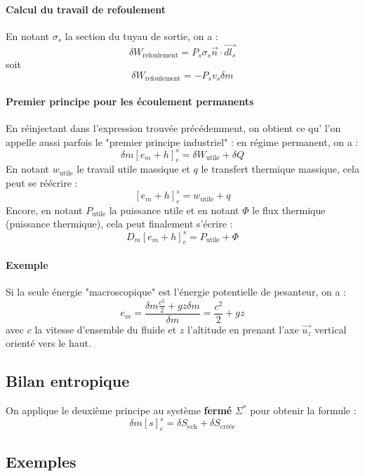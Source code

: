 \documentclass[french]{book}
\theoremstyle{plain}
\theoremstyle{definition}
\theoremstyle{remark}
\newcommand{\st}{^*}
\begin{document}
\paragraph{Calcul du travail de refoulement} En notant $\sigma_s$ la section du tuyau de sortie, on a : $$\delta W_{\text{refoulement}}=P_s\sigma_s\overrightarrow{n}\cdot\overrightarrow{dl_s}$$ soit $$\delta W_{\text{refoulement}}=-P_sv_s\delta m$$
\paragraph{Premier principe pour les écoulement permanents} En réinjectant dans l'expression trouvée précédemment, on obtient ce qu' l'on appelle aussi parfois le "premier principe industriel" : en régime permanent, on a :  $$\delta m\left[e_m+h\right]_e^s=\delta W_{\text{utile}}+\delta Q$$ En notant $w_{\text{utile}}$ le travail utile massique et $q$ le transfert thermique massique, cela peut se réécrire : $$\left[e_m+h\right]_e^s=w_{\text{utile}}+q$$ Encore, en notant $P_{\text{utile}}$ la puissance utile et en notant $\Phi$ le flux thermique (puissance thermique), cela peut finalement s'écrire : $$D_m\left[e_m+h\right]_e^s=P_{\text{utile}}+\Phi$$
\paragraph{Exemple} Si la seule énergie "macroscopique" est l'énergie potentielle de pesanteur, on a : $$e_m=\frac{\delta m\frac{c^2}{2}+gz\delta m}{\delta m}=\frac{c^2}{2}+gz$$ avec $c$ la vitesse d'ensemble du fluide et $z$ l'altitude en prenant l'axe $\overrightarrow{u_z}$ vertical orienté vers le haut.
\subsection{Bilan entropique}
On applique le deuxième principe au système \textbf{fermé} $\Sigma\st$ pour obtenir la formule : $$\delta m\left[s\right]_e^s=\delta S_\text{ech}+\delta S_\text{créée}$$
\subsection{Exemples}
\end{document}
